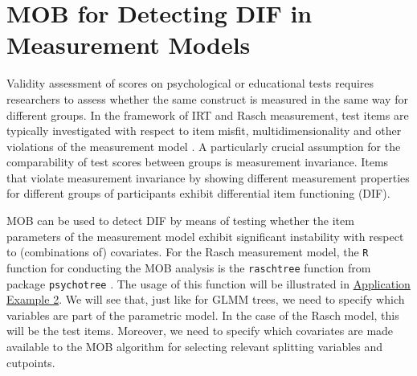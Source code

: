 \documentclass[doc,floatsintext,natbib]{apa7}
\begin{document}
\section{MOB for Detecting DIF in Measurement Models}
\label{raschtree}

Validity assessment of scores on psychological or educational tests requires researchers to assess whether the same construct is measured in the same way for different groups. In the framework of IRT and Rasch measurement, test items are typically investigated with respect to item misfit, multidimensionality and other violations of the measurement model \citep[cf., for example][for an introduction]{DebStrZei:2022:CRC}. A particularly crucial assumption for the comparability of test scores between groups is measurement invariance. Items that violate measurement invariance by showing different measurement properties for different groups of participants exhibit differential item functioning (DIF).

MOB can be used to detect DIF by means of testing whether the item parameters of the measurement model exhibit significant instability with respect to (combinations of) covariates. For the Rasch measurement model, the \texttt{R} function for conducting the MOB analysis is the \texttt{raschtree} function from package \texttt{psychotree} \citep{StroyKopf15}. The usage of this function will be illustrated in \hyperref[sec:TutorialRasch]{Application Example 2}. We will see that, just like for GLMM trees, we need to specify which variables are part of the parametric model. In the case of the Rasch model, this will be the test items. Moreover, we need to specify which covariates are made available to the MOB algorithm for selecting relevant splitting variables and cutpoints. 
\end{document}

